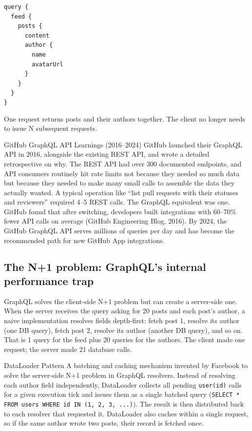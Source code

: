 \documentclass[11pt,a4paper]{article}
\begin{document}
\begin{verbatim}
query {
  feed {
    posts {
      content
      author {
        name
        avatarUrl
      }
    }
  }
}
\end{verbatim}

One request returns posts and their authors together. The client no longer needs to issue N subsequent requests.

\begin{industrybox}{GitHub GraphQL API Learnings (2016--2024)}
GitHub launched their GraphQL API in 2016, alongside the existing REST API, and wrote a detailed retrospective on why. The REST API had over 300 documented endpoints, and API consumers routinely hit rate limits not because they needed so much data but because they needed to make many small calls to assemble the data they actually wanted. A typical operation like ``list pull requests with their statuses and reviewers'' required 4--5 REST calls. The GraphQL equivalent was one. GitHub found that after switching, developers built integrations with 60--70\% fewer API calls on average (GitHub Engineering Blog, 2016). By 2024, the GitHub GraphQL API serves millions of queries per day and has become the recommended path for new GitHub App integrations.
\end{industrybox}

\subsection{The N+1 problem: GraphQL's internal performance trap}

GraphQL solves the client-side N+1 problem but can create a server-side one. When the server receives the query asking for 20 posts and each post's author, a naive implementation resolves fields depth-first: fetch post 1, resolve its author (one DB query), fetch post 2, resolve its author (another DB query), and so on. That is 1 query for the feed plus 20 queries for the authors. The client made one request; the server made 21 database calls.

\begin{termbox}{DataLoader Pattern}
A batching and caching mechanism invented by Facebook to solve the server-side N+1 problem in GraphQL resolvers. Instead of resolving each author field independently, DataLoader collects all pending \texttt{user(id)} calls for a given execution tick and issues them as a single batched query (\texttt{SELECT * FROM users WHERE id IN (1, 2, 3, ...)}). The result is then distributed back to each resolver that requested it. DataLoader also caches within a single request, so if the same author wrote two posts, their record is fetched once.
\end{termbox}
\end{document}
